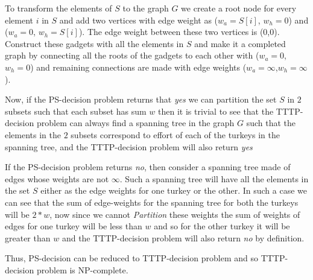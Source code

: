 \documentclass[8pt]{article}
\begin{document}
To transform the elements of $S$ to the graph $G$ we create a root node for every element $i$ in $S$ and add two vertices with edge weight as ($w_a = S[i]$, $w_h = 0$) and ($w_a = 0$, $w_h = S[i]$). The edge weight between these two vertices is (0,0). Construct these gadgets with all the elements in $S$ and make it a completed graph by connecting all the roots of the gadgets to each other with ($w_a = 0$,$w_h = 0$) and remaining connections are made with edge weights ($w_a = \infty$,$w_h = \infty$).

Now, if the PS-decision problem returns that \textit{yes} we can partition the set $S$ in $2$ subsets such that each subset has sum $w$ then it is trivial to see that the TTTP-decision problem can always find a spanning tree in the graph $G$ such that the elements in the $2$ subsets correspond to effort of each of the turkeys in the spanning tree, and the TTTP-decision problem will also return \textit{yes}

If the PS-decision problem returns \textit{no}, then consider a spanning tree made of edges whose weights are not $\infty$. Such a spanning tree will have all the elements in the set $S$ either as the edge weights for one turkey or the other. In such a case we can see that the sum of edge-weights for the spanning tree for both the turkeys will be $2*w$, now since we cannot \textit{Partition} these weights the sum of weights of edges for one turkey will be less than $w$ and so for the other turkey it will be greater than $w$ and the TTTP-decision problem will also return \textit{no} by definition.

Thus, PS-decision can be reduced to TTTP-decision problem and so TTTP-decision problem is NP-complete.
\end{document}
